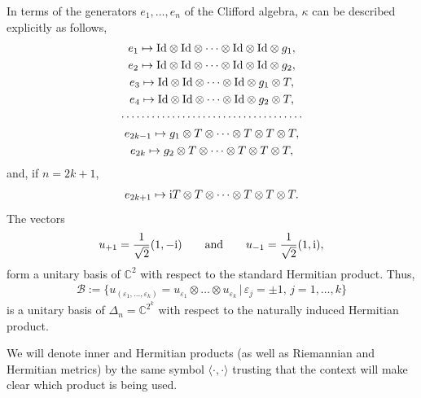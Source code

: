 \documentclass[pdftex]{sigma}
\numberwithin{equation}{section}
\begin{document}
In terms of the generators $e_1, \dots, e_n$ of the Clifford algebra, $\kappa$ can be
described explicitly as follows,
\begin{gather*}
e_1 \mapsto {\rm Id}\otimes {\rm Id}\otimes \dots\otimes {\rm Id}\otimes {\rm Id}\otimes g_1, \\
e_2 \mapsto {\rm Id}\otimes {\rm Id}\otimes \dots\otimes {\rm Id}\otimes {\rm Id}\otimes g_2, \\
e_3 \mapsto {\rm Id}\otimes {\rm Id}\otimes \dots\otimes {\rm Id}\otimes g_1\otimes T, \\
e_4 \mapsto {\rm Id}\otimes {\rm Id}\otimes \dots\otimes {\rm Id}\otimes g_2\otimes T, \\
\cdots\cdots \cdots\cdots\cdots\cdots\cdots\cdots\cdots\cdots\cdots\cdots \\
e_{2k-1} \mapsto g_1\otimes T\otimes \dots\otimes T\otimes T\otimes T, \\
e_{2k} \mapsto g_2\otimes T\otimes\dots\otimes T\otimes T\otimes T,
\end{gather*}
and, if $n=2k+1$,
\begin{gather*} e_{2k+1}\mapsto {\rm i} T\otimes T\otimes\dots\otimes T\otimes T\otimes T.\end{gather*}
The vectors
\begin{gather*} u_{+1}={1\over \sqrt{2}}(1,-{\rm i})\qquad\mbox{and}\qquad u_{-1}={1\over \sqrt{2}}(1,{\rm i}),\end{gather*}
form a unitary basis of $\mathbb{C}^2$ with respect to the standard Hermitian product. Thus,
\begin{gather*}\mathcal{B}:=\{u_{(\varepsilon_1,\dots,\varepsilon_k)}=u_{\varepsilon_1}\otimes\dots\otimes
u_{\varepsilon_k}\, |\, \varepsilon_j=\pm 1,\, j=1,\dots,k\}\end{gather*}
is a unitary basis of $\Delta_n=\mathbb{C}^{2^k}$ with respect to the naturally induced Hermitian product.

\begin{Remark} We will denote inner and Hermitian products (as well as Riemannian and Hermitian metrics) by the same symbol $\langle \cdot,\cdot\rangle $ trusting that the context will make clear which product is being used.
\end{Remark}
\end{document}
